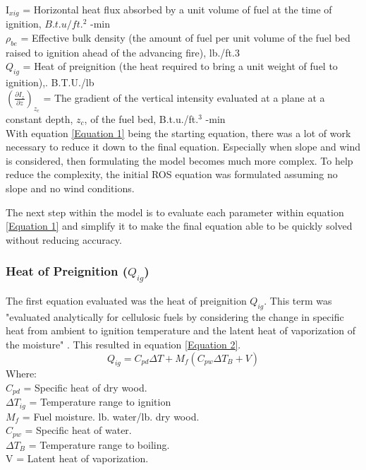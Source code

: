 \documentclass{article}
\begin{document}
\noindent I$_{xig}$ = Horizontal heat flux absorbed by a unit volume of fuel at the time of ignition, $B.t.u/ft.^2$ -min \\

\noindent $\rho_{be}$ = Effective bulk density (the amount of fuel per unit volume of the fuel bed raised to ignition ahead of the advancing fire), lb./ft.3 \\

\noindent $Q_{ig}$ = Heat of preignition (the heat required to bring a unit weight of fuel to ignition),. B.T.U./lb \\

\noindent $(\frac {\partial {I_z}} {\partial z})_{z_c}$ = The gradient of the vertical intensity evaluated at a plane at a constant depth, $z_c$, of the fuel bed, B.t.u./ft.$^3$ -min \\


\indent With equation \ref{Equation 1} being the starting equation, there was a lot of work necessary to reduce it down to the final equation. Especially when slope and wind is considered, then formulating the model becomes much more complex. To help reduce the complexity, the initial ROS equation was formulated assuming no slope and no wind conditions. 

\indent The next step within the model is to evaluate each parameter within equation \ref{Equation 1} and simplify it to make the final equation able to be quickly solved without reducing accuracy. \\
\subsubsection{Heat of Preignition ($Q_{ig}$)}
\indent The first equation evaluated was the heat of preignition $Q_{ig}$. This term was "evaluated analytically for cellulosic fuels by considering the change in specific heat from ambient to ignition temperature and the latent heat of vaporization of the moisture" \citep{Rothermel1972}. This resulted in equation \ref{Equation 2}.
\begin{equation}
	Q_{ig} = C_{pd}\Delta T + M_f (C_{pw} \Delta T_B + V)
	\label{Equation 2}
\end{equation}
Where: \\
$C_{pd}$ = Specific heat of dry wood. \\
\noindent $\Delta T_{ig}$ = Temperature range to ignition \\
\noindent $M_f$ = Fuel moisture. lb. water/lb. dry wood. \\
\noindent $C_{pw}$ = Specific heat of water. \\
\noindent $\Delta T_B$ = Temperature range to boiling. \\
\noindent V = Latent heat of vaporization. \\
\end{document}
